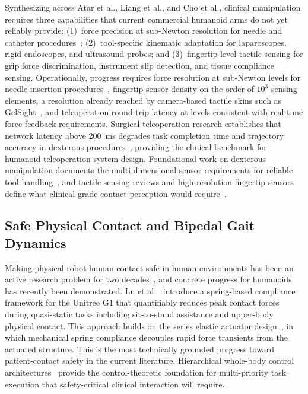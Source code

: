 Synthesizing across Atar et al., Liang et al., and Cho et al., clinical manipulation requires three
capabilities that current commercial humanoid arms do not yet reliably provide:
(1)~force precision at sub-Newton resolution for needle and catheter
procedures~\cite{atar2025humanoids}; (2)~tool-specific kinematic adaptation for
laparoscopes, rigid endoscopes, and ultrasound probes; and (3)~fingertip-level
tactile sensing for grip force discrimination, instrument slip detection, and
tissue compliance sensing. Operationally, progress requires force resolution at
sub-Newton levels for needle insertion procedures~\cite{atar2025humanoids},
fingertip sensor density on the order of $10^3$ sensing elements, a resolution
already reached by camera-based tactile skins such as
GelSight~\cite{yuan2017gelsight}, and teleoperation
round-trip latency at levels consistent with real-time force feedback
requirements. Surgical teleoperation research establishes that network latency
above 200~ms degrades task completion time and trajectory accuracy in
dexterous procedures~\cite{lum2009latency,xu2014latency,motiwala2025telesurgery},
providing the clinical benchmark for humanoid teleoperation system design.
Foundational work on dexterous manipulation documents the multi-dimensional
sensor requirements for reliable tool handling~\cite{okamura2000dexterous}, and
tactile-sensing reviews and high-resolution fingertip sensors define what
clinical-grade contact perception would
require~\cite{kappassov2015tactile,yuan2017gelsight}.

\subsection{Safe Physical Contact and Bipedal Gait Dynamics}
\label{sec:safety}

Making physical robot-human contact safe in human environments has been an
active research problem for two decades~\cite{alami2006safe}, and concrete
progress for humanoids has recently been demonstrated. Lu et
al.~\cite{lu2025gentlehumanoid} introduce a spring-based compliance framework for
the Unitree G1 that quantifiably reduces peak contact forces during quasi-static
tasks including sit-to-stand assistance and upper-body physical contact. This
approach builds on the series elastic actuator design~\cite{pratt1995elastic},
in which mechanical spring compliance decouples rapid force transients from the
actuated structure. This is the most technically grounded progress toward
patient-contact safety in the current literature. Hierarchical whole-body control
architectures~\cite{sentis2005synthesis} provide the control-theoretic foundation
for multi-priority task execution that safety-critical clinical interaction will
require.

